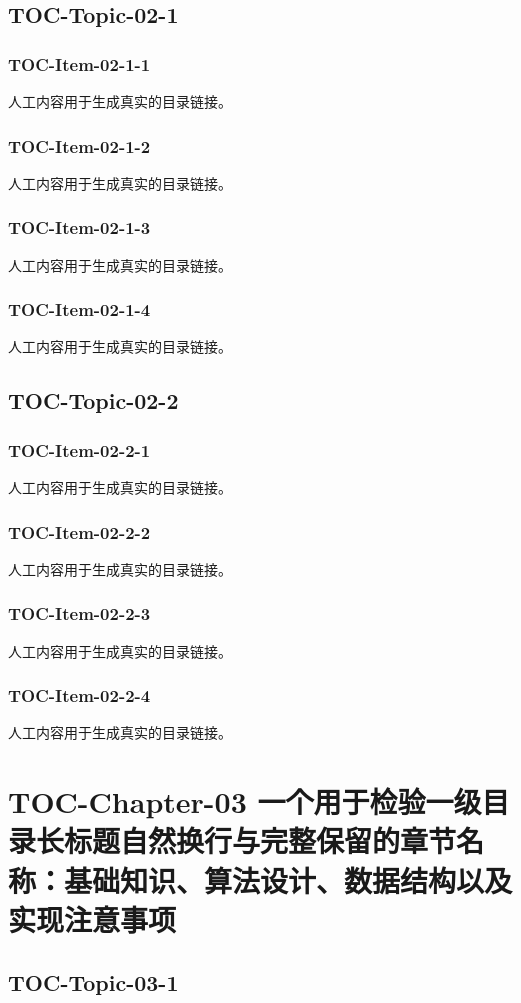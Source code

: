 \subsection{TOC-Topic-02-1}
\subsubsection{TOC-Item-02-1-1}
人工内容用于生成真实的目录链接。
\subsubsection{TOC-Item-02-1-2}
人工内容用于生成真实的目录链接。
\subsubsection{TOC-Item-02-1-3}
人工内容用于生成真实的目录链接。
\subsubsection{TOC-Item-02-1-4}
人工内容用于生成真实的目录链接。
\subsection{TOC-Topic-02-2}
\subsubsection{TOC-Item-02-2-1}
人工内容用于生成真实的目录链接。
\subsubsection{TOC-Item-02-2-2}
人工内容用于生成真实的目录链接。
\subsubsection{TOC-Item-02-2-3}
人工内容用于生成真实的目录链接。
\subsubsection{TOC-Item-02-2-4}
人工内容用于生成真实的目录链接。
\section{TOC-Chapter-03 一个用于检验一级目录长标题自然换行与完整保留的章节名称：基础知识、算法设计、数据结构以及实现注意事项}
\subsection{TOC-Topic-03-1}
